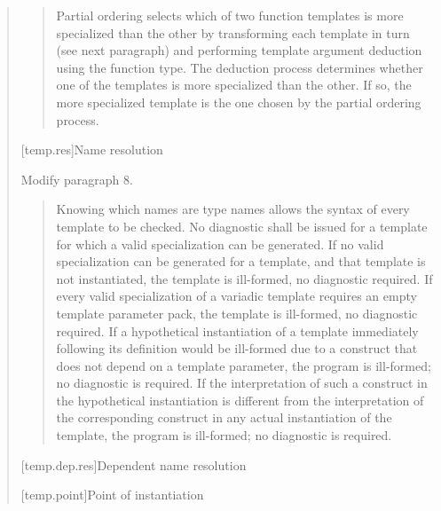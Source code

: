 \begin{quote}
\begin{quote}
\setcounter{Paras}{1}
\pnum
Partial ordering selects which of two function templates is 
more specialized than the other by transforming each template 
in turn (see next paragraph) and performing template argument 
deduction using the function type. The deduction process 
determines whether one of the templates is more specialized 
than the other.
% 
If so, the more specialized template is the one chosen by the 
partial ordering process. 
% 
\end{quote}

[temp.res]{Name resolution}

Modify paragraph 8.

\begin{quote}
\setcounter{Paras}{7}
\pnum
Knowing which names are type names allows the syntax of every
template to be checked. No diagnostic shall be issued for a template
for which a valid specialization can be generated. If no valid
specialization can be generated for a template, and that template is
not instantiated, the template is ill-formed, no diagnostic
required. If every valid specialization of a variadic template
requires an empty template parameter pack, the template is
ill-formed, no diagnostic required. 
% 
% 
% 
If a hypothetical instantiation of a template immediately following
its definition would be ill-formed due to a construct that does not
depend on a template parameter, the program is ill-formed; no
diagnostic is required. If the interpretation of such a construct in
the hypothetical instantiation is different from the interpretation
of the corresponding construct in any actual instantiation of the
template, the program is ill-formed; no diagnostic is required.
\end{quote}

\setcounter{subsection}{3}
[temp.dep.res]{Dependent name resolution}

[temp.point]{Point of instantiation}


\end{quote}
